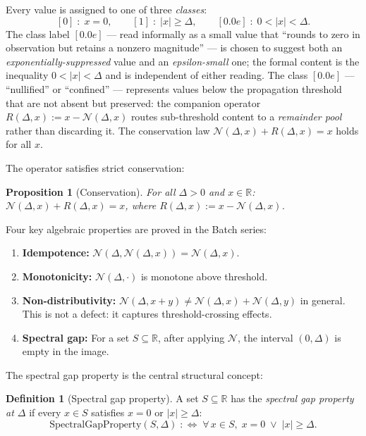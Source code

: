 \documentclass[12pt, a4paper]{article}
\theoremstyle{plain}
\newtheorem{proposition}[theorem]{Proposition}
\theoremstyle{definition}
\newtheorem{definition}[theorem]{Definition}
\newcommand{\N}{\mathcal{N}}
\newcommand{\R}{\mathbb{R}}
\begin{document}
Every value is assigned to one of three \emph{classes}:
\[
  [0] \;:\; x = 0,
  \qquad
  [1] \;:\; |x| \geq \Delta,
  \qquad
  [0.0e] \;:\; 0 < |x| < \Delta.
\]
The class label $[0.0e]$ — read informally as a small value that
``rounds to zero in observation but retains a nonzero magnitude'' — is
chosen to suggest both an \emph{exponentially-suppressed} value and an
\emph{epsilon-small} one; the formal content is the inequality
$0 < |x| < \Delta$ and is independent of either reading.
The class $[0.0e]$ — ``nullified'' or ``confined'' — represents values
below the propagation threshold that are not absent but preserved: the companion
operator $R(\Delta, x) := x - \N(\Delta, x)$ routes sub-threshold content
to a \emph{remainder pool} rather than discarding it.
The conservation law $\N(\Delta, x) + R(\Delta, x) = x$ holds for all $x$.

The operator satisfies strict conservation:

\begin{proposition}[Conservation]
\label{prop:conservation}
For all $\Delta > 0$ and $x \in \R$:
$\N(\Delta, x) + R(\Delta, x) = x$,
where $R(\Delta, x) := x - \N(\Delta, x)$.
\end{proposition}

Four key algebraic properties are proved in the Batch series:

\begin{enumerate}[label=\textbf{P\arabic*.}]
  \item \textbf{Idempotence:} $\N(\Delta, \N(\Delta, x)) = \N(\Delta, x)$.
  \item \textbf{Monotonicity:} $\N(\Delta, \cdot)$ is monotone above threshold.
  \item \textbf{Non-distributivity:}
        $\N(\Delta, x + y) \neq \N(\Delta, x) + \N(\Delta, y)$ in general.
        This is not a defect: it captures threshold-crossing effects.
  \item \textbf{Spectral gap:} For a set $S \subseteq \R$, after applying $\N$,
        the interval $(0, \Delta)$ is empty in the image.
\end{enumerate}

The spectral gap property is the central structural concept:

\begin{definition}[Spectral gap property]
\label{def:sgp}
A set $S \subseteq \R$ has the \emph{spectral gap property at $\Delta$}
if every $x \in S$ satisfies $x = 0$ or $|x| \geq \Delta$:
\[
  \mathrm{SpectralGapProperty}(S, \Delta)
  \;:\Longleftrightarrow\;
  \forall\, x \in S,\; x = 0 \;\vee\; |x| \geq \Delta.
\]
\end{definition}
\end{document}

